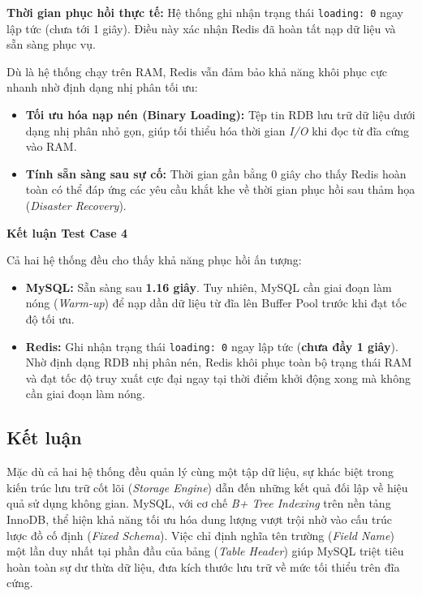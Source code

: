 \textbf{Thời gian phục hồi thực tế:} Hệ thống ghi nhận trạng thái \texttt{loading: 0} ngay lập tức (chưa tới 1 giây). Điều này xác nhận Redis đã hoàn tất nạp dữ liệu và sẵn sàng phục vụ.

Dù là hệ thống chạy trên RAM, Redis vẫn đảm bảo khả năng khôi phục cực nhanh nhờ định dạng nhị phân tối ưu:
\begin{itemize}
\item \textbf{Tối ưu hóa nạp nén (Binary Loading):} Tệp tin RDB lưu trữ dữ liệu dưới dạng nhị phân nhỏ gọn, giúp tối thiểu hóa thời gian \textit{I/O} khi đọc từ đĩa cứng vào RAM.
\item \textbf{Tính sẵn sàng sau sự cố:} Thời gian gần bằng 0 giây cho thấy Redis hoàn toàn có thể đáp ứng các yêu cầu khắt khe về thời gian phục hồi sau thảm họa (\textit{Disaster Recovery}).
\end{itemize}

\vspace{0.5em}

\noindent\textbf{Kết luận Test Case 4}

Cả hai hệ thống đều cho thấy khả năng phục hồi ấn tượng:

\begin{itemize}
    \item \textbf{MySQL:} Sẵn sàng sau \textbf{1.16 giây}. Tuy nhiên, MySQL cần giai đoạn làm nóng (\textit{Warm-up}) để nạp dần dữ liệu từ đĩa lên Buffer Pool trước khi đạt tốc độ tối ưu.
    \item \textbf{Redis:} Ghi nhận trạng thái \texttt{loading: 0} ngay lập tức (\textbf{chưa đầy 1 giây}). Nhờ định dạng RDB nhị phân nén, Redis khôi phục toàn bộ trạng thái RAM và đạt tốc độ truy xuất cực đại ngay tại thời điểm khởi động xong mà không cần giai đoạn làm nóng.
\end{itemize}

\subsection{Kết luận}

\leavevmode\par
\vspace{0.5em}

Mặc dù cả hai hệ thống đều quản lý cùng một tập dữ liệu, sự khác biệt trong kiến trúc lưu trữ cốt lõi (\textit{Storage Engine}) dẫn đến những kết quả đối lập về hiệu quả sử dụng không gian. MySQL, với cơ chế \textit{B+ Tree Indexing} trên nền tảng InnoDB, thể hiện khả năng tối ưu hóa dung lượng vượt trội nhờ vào cấu trúc lược đồ cố định (\textit{Fixed Schema}). Việc chỉ định nghĩa tên trường (\textit{Field Name}) một lần duy nhất tại phần đầu của bảng (\textit{Table Header}) giúp MySQL triệt tiêu hoàn toàn sự dư thừa dữ liệu, đưa kích thước lưu trữ về mức tối thiểu trên đĩa cứng.


